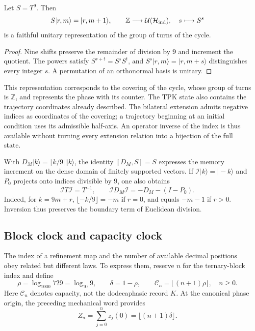 \begin{proposition}
\label{mono-ampl:representacion}
Let \(S=T^9\). Then
\[
 S|r,m\rangle=|r,m+1\rangle,\qquad
 \mathbb Z\longrightarrow\mathcal U(\mathcal H_{\rm ind}),
 \quad s\longmapsto S^s
\]
is a faithful unitary representation of the group of turns of the cycle.
\end{proposition}
\begin{proof}
Nine shifts preserve the remainder of division by \(9\) and
increment the quotient. The powers satisfy
\(S^{s+t}=S^sS^t\), and \(S^s|r,m\rangle=|r,m+s\rangle\) distinguishes
every integer \(s\). A permutation of an orthonormal basis is unitary.
\end{proof}

This representation corresponds to the covering of the cycle, whose group
of turns is \(\mathbb Z\), and represents the phase with its counter. The
TPK state also contains the trajectory coordinates already described.
The bilateral extension admits negative indices as coordinates of the
covering; a trajectory beginning at an initial condition uses
its admissible half-axis. An operator inverse of the index is thus available
without turning every extension relation into a bijection of the
full state.

With \(D_M|k\rangle=\lfloor k/9\rfloor|k\rangle\), the identity
\([D_M,S]=S\) expresses the memory increment on the dense domain of
finitely supported vectors. If \(\mathcal I|k\rangle=|-k\rangle\) and
\(P_0\) projects onto indices divisible by \(9\), one also obtains
\begin{equation}
 \mathcal I T\mathcal I=T^{-1},\qquad
 \mathcal I D_M\mathcal I=-D_M-(I-P_0).
 \label{mono-ampl:inversion-contador}
\end{equation}
Indeed, for \(k=9m+r\),
\(\lfloor-k/9\rfloor=-m\) if \(r=0\), and equals \(-m-1\) if \(r>0\).
Inversion thus preserves the boundary term of Euclidean division.

\subsection{Block clock and capacity clock}
\label{mono-ampl:relojes}

The index of a refinement map and the number of available decimal
positions obey related but different laws. To express
them, reserve \(n\) for the ternary-block index and define
\[
 \rho=\log_{1000}729=\log_{10}9,\qquad
 \delta=1-\rho,\qquad
 \mathcal C_n=\lfloor(n+1)\rho\rfloor,\quad n\geq0.
\]
Here \(\mathcal C_n\) denotes capacity, not the dodecaphasic
record \(K\). At the canonical phase origin, the preceding mechanical
word provides
\[
 Z_n=\sum_{j=0}^{n}z_j(0)=\lfloor(n+1)\delta\rfloor.
\]

